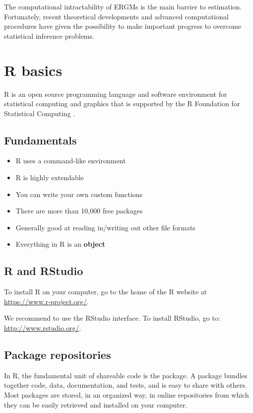 \documentclass[]{book}
\providecommand{\tightlist}{%
  \setlength{\itemsep}{0pt}\setlength{\parskip}{0pt}}
\begin{document}
The computational intractability of ERGMs is the main barrier to
estimation. Fortunately, recent theoretical developments and advanced
computational procedures have given the possibility to make important
progress to overcome statistical inference problems.

\chapter{R basics}\label{Rbasics}

R is an open source programming language and software environment for
statistical computing and graphics that is supported by the R Foundation
for Statistical Computing \citep{R}.

\section{Fundamentals}\label{fundamentals}

\begin{itemize}
\tightlist
\item
  R uses a command-like environment
\item
  R is highly extendable
\item
  You can write your own custom functions
\item
  There are more than 10,000 free packages
\item
  Generally good at reading in/writing out other file formats
\item
  Everything in R is an \textbf{object}
\end{itemize}

\section{R and RStudio}\label{r-and-rstudio}

To install R on your computer, go to the home of the R website at
\url{https://www.r-project.org/}.

We recommend to use the RStudio interface. To install RStudio, go to:
\url{http://www.rstudio.org/}.

\section{Package repositories}\label{package-repositories}

In R, the fundamental unit of shareable code is the package. A package
bundles together code, data, documentation, and tests, and is easy to
share with others. Most packages are stored, in an organized way, in
online repositories from which they can be easily retrieved and
installed on your computer.
\end{document}
